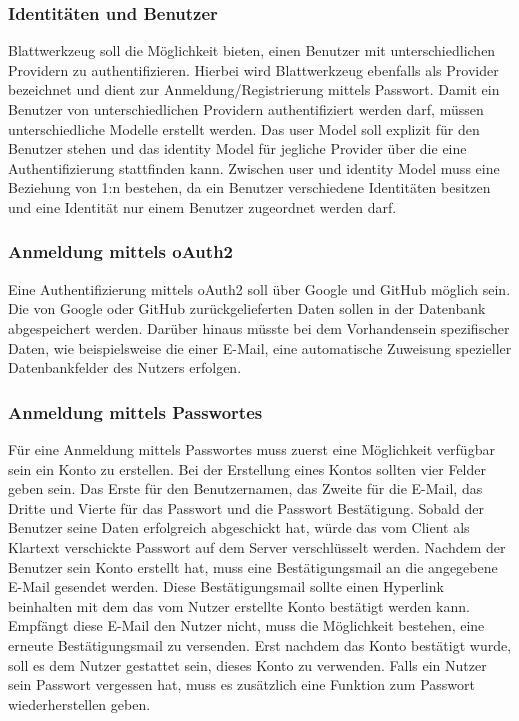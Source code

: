 \subsubsection{Identitäten und Benutzer}
\label{sec:identities_users}
Blattwerkzeug soll die Möglichkeit bieten, einen Benutzer mit unterschiedlichen Providern zu authentifizieren. Hierbei wird Blattwerkzeug ebenfalls als Provider bezeichnet und dient zur Anmeldung/Registrierung mittels Passwort. Damit ein Benutzer von unterschiedlichen Providern authentifiziert werden darf, müssen unterschiedliche Modelle erstellt werden. Das user Model soll explizit für den Benutzer stehen und das identity Model für jegliche Provider über die eine Authentifizierung stattfinden kann. Zwischen user und identity Model muss eine Beziehung von 1:n bestehen, da ein Benutzer verschiedene Identitäten besitzen und eine Identität nur einem Benutzer zugeordnet werden darf.

\subsubsection{Anmeldung mittels \gls{oAuth2}}
Eine Authentifizierung mittels oAuth2 soll über Google und GitHub möglich sein. Die von Google oder GitHub zurückgelieferten Daten sollen in der Datenbank abgespeichert werden. Darüber hinaus müsste bei dem Vorhandensein spezifischer Daten, wie beispielsweise die einer E-Mail, eine automatische Zuweisung spezieller Datenbankfelder des Nutzers erfolgen.

\subsubsection{Anmeldung mittels Passwortes}
Für eine Anmeldung mittels Passwortes muss zuerst eine Möglichkeit verfügbar sein ein Konto zu erstellen. Bei der Erstellung eines Kontos sollten vier Felder geben sein. Das Erste für den Benutzernamen, das Zweite für die E-Mail, das Dritte und Vierte für das Passwort und die Passwort Bestätigung. Sobald der Benutzer seine Daten erfolgreich abgeschickt hat, würde das vom Client als Klartext verschickte Passwort auf dem Server verschlüsselt werden. Nachdem der Benutzer sein Konto erstellt hat, muss eine Bestätigungsmail an die angegebene E-Mail gesendet werden. Diese Bestätigungsmail sollte einen Hyperlink beinhalten mit dem das vom Nutzer erstellte Konto bestätigt werden kann. Empfängt diese E-Mail den Nutzer nicht, muss die Möglichkeit bestehen, eine erneute Bestätigungsmail zu versenden. Erst nachdem das Konto bestätigt wurde, soll es dem Nutzer gestattet sein, dieses Konto zu verwenden. Falls ein Nutzer sein Passwort vergessen hat, muss es zusätzlich eine Funktion zum Passwort wiederherstellen geben.

